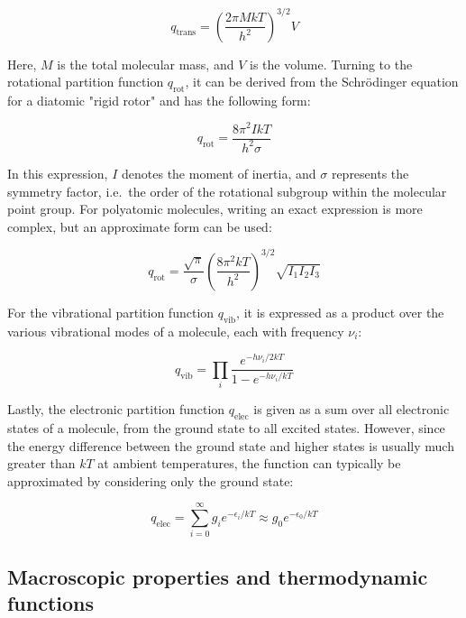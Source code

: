 \begin{equation}
    q_{\text{trans}} = \left(\frac{2\pi MkT}{h^2}\right)^{3/2} V
\end{equation}

Here, $M$ is the total molecular mass, and $V$ is the volume. Turning to the rotational partition function $q_\text{rot}$, it can be derived from the Schr\"odinger equation for a diatomic "rigid rotor" and has the following form:

\begin{equation}
    q_{\text{rot}} = \frac{8\pi^2IkT}{h^2\sigma}
\end{equation}

In this expression, $I$ denotes the moment of inertia, and $\sigma$ represents the symmetry factor, i.e.\ the order of the rotational subgroup within the molecular point group. For polyatomic molecules, writing an exact expression is more complex, but an approximate form can be used:

\begin{equation}
    q_{\text{rot}} = \frac{\sqrt{\pi}}{\sigma}\left(\frac{8\pi^2kT}{h^2}\right)^{3/2} \sqrt{I_1I_2I_3}
\end{equation}

For the vibrational partition function $q_\text{vib}$, it is expressed as a product over the various vibrational modes of a molecule, each with frequency $\nu_i$:

\begin{equation}
    q_{\text{vib}} = \prod_{i} \frac{e^{-h\nu_i/2kT}}{1-e^{-h\nu_i/kT}}
\end{equation}

Lastly, the electronic partition function $q_\text{elec}$ is given as a sum over all electronic states of a molecule, from the ground state to all excited states. However, since the energy difference between the ground state and higher states is usually much greater than $kT$ at ambient temperatures, the function can typically be approximated by considering only the ground state:

\begin{equation}
    q_{\text{elec}} = \sum_{i=0}^{\infty} g_i e^{-\epsilon_i/kT} \approx g_0 e^{-\epsilon_0/kT}
\end{equation} 



\subsection{Macroscopic properties and thermodynamic functions}

